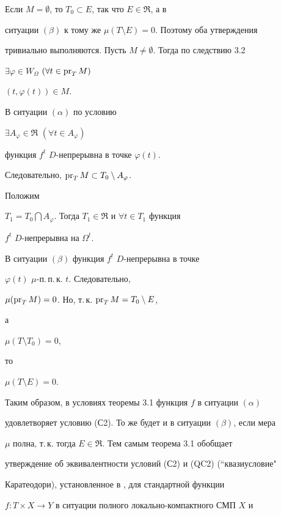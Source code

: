 \begin{pf} Если $M=\emptyset$, то $T_0\subset E$, так что $E\in\Re$, а в


ситуации $(\beta)$ к тому же $\mu(T\setminus E)=0$. Поэтому оба утверждения


тривиально выполняются. Пусть $M\ne\emptyset$. Тогда по следствию 3.2


$\exists\varphi\in W_\Omega$ \; $(\forall t\in\operatorname{pr}_T M)$ \;


$(t,\varphi(t))\in M$.





В ситуации $(\alpha)$ по условию


$\exists A_\varphi\in\Re$ \; $(\forall t\in A_\varphi)$


функция $f^t$ \; $D$-непрерывна в точке $\varphi(t)$.


Следовательно, $\operatorname{pr}_T M\subset T_0\setminus A_\varphi$.


Положим


$T_1=T_0\bigcap A_\varphi$. Тогда $T_1\in\Re$ и $\forall t\in T_1$ функция


$f^t$ \; $D$-непрерывна на $\Omega^t$.





В ситуации $(\beta)$ функция $f^t$ \; $D$-непрерывна в точке


$\varphi(t)$ $\mu$-п.\,п.\,к. $t$. Следовательно,


$\mu(\operatorname{pr}_T M)=0$. Но, т.\,к. $\operatorname{pr}_TM=T_0\setminus E$,


а


$\mu (T\setminus T_0)=0$,


то


$\mu (T\setminus E)=0$.


\end{pf}





Таким образом, в условиях теоремы 3.1 функция $f$ в ситуации $(\alpha)$


удовлетворяет условию (С2). То же будет и в ситуации $(\beta)$, если мера


$\mu$ полна, т.\,к. тогда $E\in\Re$. Тем самым теорема 3.1 обобщает


утверждение об эквивалентности условий (С2) и (QC2) (``квазиусловие"


Каратеодори), установленное в \cite{Sh6}, \cite{Sh7} для стандартной функции


$f:T\times X\to Y$ в ситуации полного локально-компактного СМП $X$ и


